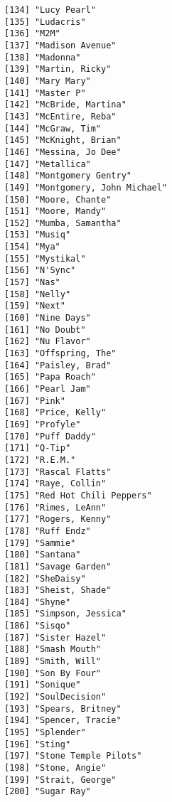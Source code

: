 \documentclass[
  letterpaper,
  DIV=11,
  numbers=noendperiod]{scrreprt}
\begin{document}
\begin{itemize}
\begin{verbatim}
[134] "Lucy Pearl"                    
[135] "Ludacris"                      
[136] "M2M"                           
[137] "Madison Avenue"                
[138] "Madonna"                       
[139] "Martin, Ricky"                 
[140] "Mary Mary"                     
[141] "Master P"                      
[142] "McBride, Martina"              
[143] "McEntire, Reba"                
[144] "McGraw, Tim"                   
[145] "McKnight, Brian"               
[146] "Messina, Jo Dee"               
[147] "Metallica"                     
[148] "Montgomery Gentry"             
[149] "Montgomery, John Michael"      
[150] "Moore, Chante"                 
[151] "Moore, Mandy"                  
[152] "Mumba, Samantha"               
[153] "Musiq"                         
[154] "Mya"                           
[155] "Mystikal"                      
[156] "N'Sync"                        
[157] "Nas"                           
[158] "Nelly"                         
[159] "Next"                          
[160] "Nine Days"                     
[161] "No Doubt"                      
[162] "Nu Flavor"                     
[163] "Offspring, The"                
[164] "Paisley, Brad"                 
[165] "Papa Roach"                    
[166] "Pearl Jam"                     
[167] "Pink"                          
[168] "Price, Kelly"                  
[169] "Profyle"                       
[170] "Puff Daddy"                    
[171] "Q-Tip"                         
[172] "R.E.M."                        
[173] "Rascal Flatts"                 
[174] "Raye, Collin"                  
[175] "Red Hot Chili Peppers"         
[176] "Rimes, LeAnn"                  
[177] "Rogers, Kenny"                 
[178] "Ruff Endz"                     
[179] "Sammie"                        
[180] "Santana"                       
[181] "Savage Garden"                 
[182] "SheDaisy"                      
[183] "Sheist, Shade"                 
[184] "Shyne"                         
[185] "Simpson, Jessica"              
[186] "Sisqo"                         
[187] "Sister Hazel"                  
[188] "Smash Mouth"                   
[189] "Smith, Will"                   
[190] "Son By Four"                   
[191] "Sonique"                       
[192] "SoulDecision"                  
[193] "Spears, Britney"               
[194] "Spencer, Tracie"               
[195] "Splender"                      
[196] "Sting"                         
[197] "Stone Temple Pilots"           
[198] "Stone, Angie"                  
[199] "Strait, George"                
[200] "Sugar Ray"                     

\end{verbatim}
\end{itemize}
\end{document}
